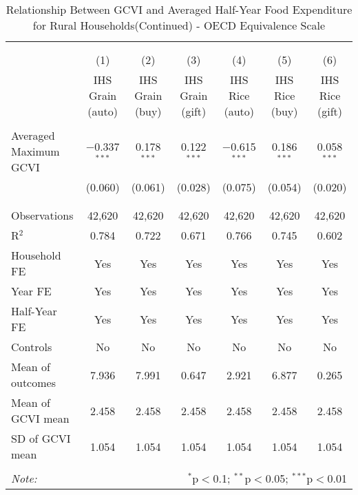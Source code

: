 
\begin{table}[!htbp] \centering 
  \caption{Relationship Between GCVI and Averaged Half-Year Food Expenditure for Rural Households(Continued) - OECD Equivalence Scale} 
  \label{gcvi_table_2_1.tex} 
\normalsize 
\begin{tabular}{@{\extracolsep{5pt}}lcccccc} 
\\[-1.8ex]\hline 
\hline \\[-1.8ex] 
\\[-1.8ex] & (1) & (2) & (3) & (4) & (5) & (6)\\ 
 & IHS Grain (auto) & IHS Grain (buy) & IHS Grain (gift) & IHS Rice (auto) & IHS Rice (buy) & IHS Rice (gift) \\ 
\hline \\[-1.8ex] 
 Averaged Maximum GCVI & $-$0.337$^{***}$ & 0.178$^{***}$ & 0.122$^{***}$ & $-$0.615$^{***}$ & 0.186$^{***}$ & 0.058$^{***}$ \\ 
  & (0.060) & (0.061) & (0.028) & (0.075) & (0.054) & (0.020) \\ 
  & & & & & & \\ 
\hline \\[-1.8ex] 
Observations & 42,620 & 42,620 & 42,620 & 42,620 & 42,620 & 42,620 \\ 
R$^{2}$ & 0.784 & 0.722 & 0.671 & 0.766 & 0.745 & 0.602 \\ 
Household FE & Yes & Yes & Yes & Yes & Yes & Yes \\ 
Year FE & Yes & Yes & Yes & Yes & Yes & Yes \\ 
Half-Year FE & Yes & Yes & Yes & Yes & Yes & Yes \\ 
Controls & No & No & No & No & No & No \\ 
Mean of outcomes & 7.936 & 7.991 & 0.647 & 2.921 & 6.877 & 0.265 \\ 
Mean of GCVI mean & 2.458 & 2.458 & 2.458 & 2.458 & 2.458 & 2.458 \\ 
SD of GCVI mean & 1.054 & 1.054 & 1.054 & 1.054 & 1.054 & 1.054 \\ 
\hline \\[-1.8ex] 
\textit{Note:}  & \multicolumn{6}{r}{$^{*}$p$<$0.1; $^{**}$p$<$0.05; $^{***}$p$<$0.01} \\ 
\end{tabular} 
\end{table} 
